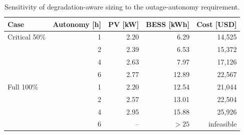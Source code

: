 \begin{table}[t]
\centering
\small
\caption{Sensitivity of degradation-aware sizing to the outage-autonomy requirement.}
\label{tab:autonomy}
\begin{tabular}{lrrrr}
\toprule
Case & Autonomy [h] & PV [kW] & BESS [kWh] & Cost [USD] \\
\midrule
Critical 50\% & 1 & 2.20 & 6.29 & 14,525 \\
 & 2 & 2.39 & 6.53 & 15,372 \\
 & 4 & 2.63 & 7.97 & 17,126 \\
 & 6 & 2.77 & 12.89 & 22,567 \\
Full 100\% & 1 & 2.20 & 12.54 & 21,044 \\
 & 2 & 2.57 & 13.01 & 22,504 \\
 & 4 & 2.95 & 15.88 & 25,926 \\
 & 6 & -- & $>25$ & infeasible \\
\bottomrule
\end{tabular}
\par\vspace{1mm}{\footnotesize The 6-h full-service design is infeasible under the 25-kWh cap; an expanded-bound solve certified a minimum of 25.63 kWh.}
\end{table}
